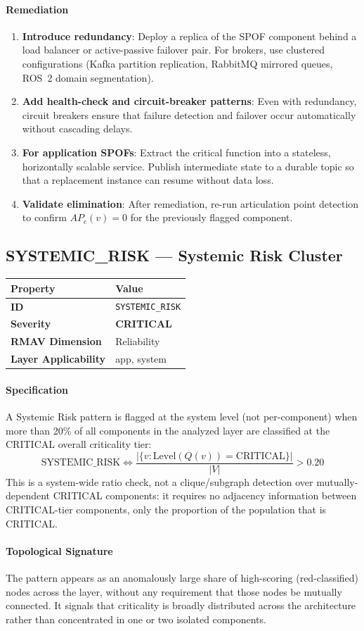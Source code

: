 \documentclass[11pt]{article}
\makeatletter
\newcommand{\CRITICAL}{\textcolor{red!70!black}{\textbf{CRITICAL}}}
\newcommand{\patternprop}[4]{%
  \begin{center}
  \begin{tabular}{@{}ll@{}}
  \toprule
  \textbf{Property} & \textbf{Value} \\
  \midrule
  \textbf{ID} & \texttt{#1} \\
  \textbf{Severity} & #2 \\
  \textbf{RMAV Dimension} & #3 \\
  \textbf{Layer Applicability} & #4 \\
  \bottomrule
  \end{tabular}
  \end{center}
}
\makeatother
\begin{document}
\paragraph{Remediation}
\begin{enumerate}[leftmargin=*]
\item \textbf{Introduce redundancy}: Deploy a replica of the SPOF component behind a load balancer or active-passive failover pair. For brokers, use clustered configurations (Kafka partition replication, RabbitMQ mirrored queues, ROS~2 domain segmentation).
\item \textbf{Add health-check and circuit-breaker patterns}: Even with redundancy, circuit breakers ensure that failure detection and failover occur automatically without cascading delays.
\item \textbf{For application SPOFs}: Extract the critical function into a stateless, horizontally scalable service. Publish intermediate state to a durable topic so that a replacement instance can resume without data loss.
\item \textbf{Validate elimination}: After remediation, re-run articulation point detection to confirm $AP_c(v) = 0$ for the previously flagged component.
\end{enumerate}

\subsection{SYSTEMIC\_RISK --- Systemic Risk Cluster}
\patternprop{SYSTEMIC\_RISK}{\CRITICAL}{Reliability}{app, system}

\paragraph{Specification}
A Systemic Risk pattern is flagged at the system level (not per-component) when more than 20\% of all components in the analyzed layer are classified at the CRITICAL overall criticality tier:
\[
\mathrm{SYSTEMIC\_RISK} \Leftrightarrow \frac{|\{v : \mathrm{Level}(Q(v)) = \mathrm{CRITICAL}\}|}{|V|} > 0.20
\]
This is a system-wide ratio check, not a clique/subgraph detection over mutually-dependent CRITICAL components: it requires no adjacency information between CRITICAL-tier components, only the proportion of the population that is CRITICAL.

\paragraph{Topological Signature}
The pattern appears as an anomalously large share of high-scoring (red-classified) nodes across the layer, without any requirement that those nodes be mutually connected. It signals that criticality is broadly distributed across the architecture rather than concentrated in one or two isolated components.
\end{document}
